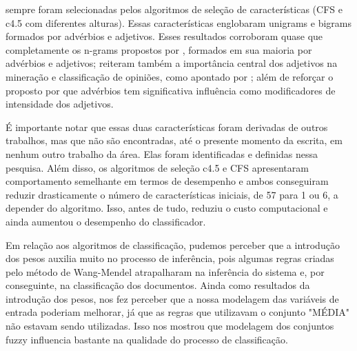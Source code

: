 \documentclass[template.tex]{subfiles}
\begin{document}
sempre foram selecionadas pelos algoritmos de seleção de características (CFS e c4.5 com diferentes alturas). Essas características englobaram unigrams e bigrams formados por advérbios e adjetivos. Esses resultados corroboram quase que completamente os n-grams propostos por , formados em sua maioria por advérbios e adjetivos; reiteram também a importância central dos adjetivos na mineração e classificação de opiniões, como apontado por ; além de reforçar o proposto por  que advérbios tem significativa influência como modificadores de intensidade dos adjetivos. 

É importante notar que essas duas características foram derivadas de outros trabalhos, mas que não são encontradas, até o presente momento da escrita, em nenhum outro trabalho da área. Elas foram identificadas e definidas nessa pesquisa. Além disso, os algoritmos de seleção c4.5 e CFS apresentaram comportamento semelhante em termos de desempenho e ambos conseguiram reduzir drasticamente o número de características iniciais, de 57 para 1 ou 6, a depender do algoritmo. Isso, antes de tudo, reduziu o custo computacional e ainda aumentou o desempenho do classificador. 

Em relação aos algoritmos de classificação, pudemos perceber que a introdução dos pesos auxilia muito no processo de inferência, pois algumas regras criadas pelo método de Wang-Mendel atrapalharam na inferência do sistema e, por conseguinte, na classificação dos documentos. Ainda como resultados da introdução dos pesos, nos fez perceber que a nossa modelagem das variáveis de entrada poderiam melhorar, já que as regras que utilizavam o conjunto "MÉDIA" não estavam sendo utilizadas. Isso nos mostrou que modelagem dos conjuntos fuzzy influencia bastante na qualidade do processo de classificação.



\end{document}

